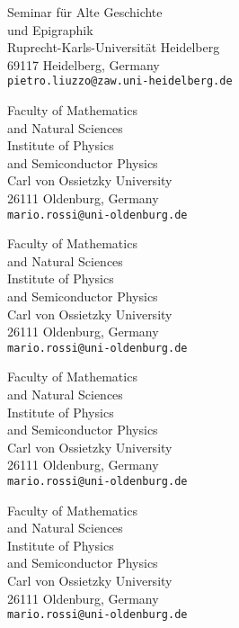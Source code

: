 \begin{contributors}

{Seminar für Alte Geschichte\\ und Epigraphik\\
Ruprecht-Karls-Universität Heidelberg\\
69117 Heidelberg, Germany\\
\texttt{pietro.liuzzo@zaw.uni-heidelberg.de}}

{Faculty of Mathematics\\ and Natural Sciences\\
Institute of Physics\\
and Semiconductor Physics\\
Carl von Ossietzky University\\
26111 Oldenburg, Germany\\
\texttt{mario.rossi@uni-oldenburg.de}}

{Faculty of Mathematics\\ and Natural Sciences\\
Institute of Physics\\
and Semiconductor Physics\\
Carl von Ossietzky University\\
26111 Oldenburg, Germany\\
\texttt{mario.rossi@uni-oldenburg.de}}

{Faculty of Mathematics\\ and Natural Sciences\\
Institute of Physics\\
and Semiconductor Physics\\
Carl von Ossietzky University\\
26111 Oldenburg, Germany\\
\texttt{mario.rossi@uni-oldenburg.de}}

{Faculty of Mathematics\\ and Natural Sciences\\
Institute of Physics\\
and Semiconductor Physics\\
Carl von Ossietzky University\\
26111 Oldenburg, Germany\\
\texttt{mario.rossi@uni-oldenburg.de}}


\end{contributors}
